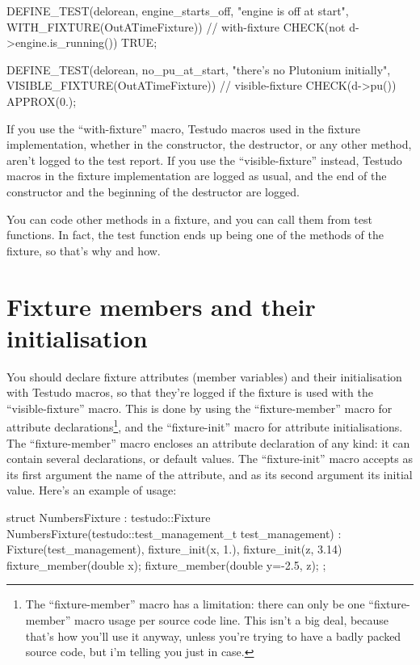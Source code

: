 \documentclass[twoside, a4paper, article]{memoir}
\begin{document}
\begin{cpplisting}
DEFINE_TEST(delorean,
            engine_starts_off, "engine is off at start",
            WITH_FIXTURE(OutATimeFixture)) // with-fixture
{
  CHECK(not d->engine.is_running()) TRUE;
}

DEFINE_TEST(delorean,
            no_pu_at_start, "there's no Plutonium initially",
            VISIBLE_FIXTURE(OutATimeFixture)) // visible-fixture
{
  CHECK(d->pu()) APPROX(0.);
}
\end{cpplisting}

If you use the ``with-fixture'' macro, Testudo macros used in the fixture
implementation, whether in the constructor, the destructor, or any other
method, aren't logged to the test report.  If you use the ``visible-fixture''
instead, Testudo macros in the fixture implementation are logged as usual, and
the end of the constructor and the beginning of the destructor are logged.

You can code other methods in a fixture, and you can call them from test
functions.  In fact, the test function ends up being one of the methods of the
fixture, so that's why and how.

\section{Fixture members and their initialisation}
\label{sec:fixture-members-and-initialisation}

You should declare fixture attributes (member variables) and their
initialisation with Testudo macros, so that they're logged if the fixture is
used with the ``visible-fixture'' macro.  This is done by using the
``fixture-member'' macro for attribute declarations\footnote{The
  ``fixture-member'' macro has a limitation: there can only be one
  ``fixture-member'' macro usage per source code line.  This isn't a big deal,
  because that's how you'll use it anyway, unless you're trying to have a badly
  packed source code, but i'm telling you just in case.}, and the
``fixture-init'' macro for attribute initialisations.  The ``fixture-member''
macro encloses an attribute declaration of any kind: it can contain several
declarations, or default values.  The ``fixture-init'' macro accepts as its
first argument the name of the attribute, and as its second argument its
initial value.  Here's an example of usage:
\begin{cpplisting}
struct NumbersFixture : testudo::Fixture {
  NumbersFixture(testudo::test_management_t test_management)
    : Fixture(test_management),
      fixture_init(x, 1.), fixture_init(z, 3.14) { }
  fixture_member(double x);
  fixture_member(double y=-2.5, z);
};
\end{cpplisting}
\end{document}
